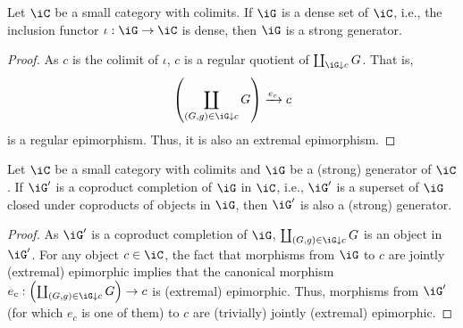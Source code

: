 \documentclass{zett}
\begin{document}
\begin{lem}\label{lem:colimits-strong-generators}
  Let $\iC$ be a small category with colimits.
  If $\iG$ is a dense set of $\iC$, i.e., the inclusion functor $\iota : \iG \to \iC$ is dense, then $\iG$ is a strong generator.
\end{lem}
\begin{proof}
  As $c$ is the colimit of $\iota$, $c$ is a regular quotient of $\coprod_{\iG \dn c}G$.
  That is,
  \[
    \left(\coprod_{(G,g) \in \iG \dn c}G\right) \xrightarrow{e_{c}} c
  \]
  is a regular epimorphism.
  Thus, it is also an extremal epimorphism.
\end{proof}

\begin{lem}\label{lem:srong-coprod-comp-strong}
  Let $\iC$ be a small category with colimits and $\iG$ be a (strong) generator of $\iC$.
  If $\iG'$ is a coproduct completion of $\iG$ in $\iC$, i.e., $\iG'$ is a superset of $\iG$ closed under coproducts of objects in $\iG$, then $\iG'$ is also a (strong) generator.
\end{lem}
\begin{proof}
  As $\iG'$ is a coproduct completion of $\iG$, $\coprod_{(G,g) \in \iG \dn c}G$ is an object in $\iG'$.
  For any object $c \in \iC$, the fact that morphisms from $\iG$ to $c$ are jointly (extremal) epimorphic implies that the canonical morphism $e_{c} : \left(\coprod_{(G,g) \in \iG \dn c}G\right) \to c$ is (extremal) epimorphic.
  Thus, morphisms from $\iG'$ (for which $e_{c}$ is one of them) to $c$ are (trivially) jointly (extremal) epimorphic.
\end{proof}
\end{document}
